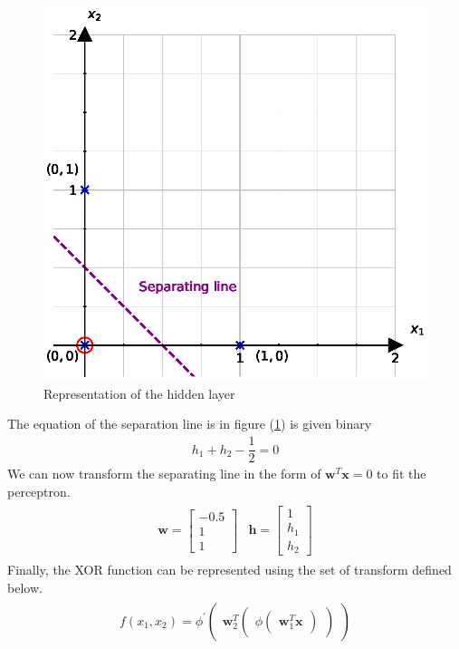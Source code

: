 \begin{figure}[H]
  \centering
  \includegraphics[scale=0.75]{CHAPTER_2/c2_fig_XOR_sep_python.eps}
  \caption{Representation of the hidden layer}
  \label{fig:XOR layer}
\end{figure}
\noindent The equation of the separation line is in figure (\ref{fig:XOR layer}) is given binary
\begin{align}
h_1 + h_2 - \dfrac{1}{2} = 0  
\end{align}
We can now transform the separating line in the form of $\textbf{w}^T\textbf{x} = 0$ to fit the perceptron.
\begin{align}
  \begin{matrix}
    \textbf{w} = \begin{bmatrix}
      -0.5 \\
      1 \\
      1
    \end{bmatrix} & \textbf{h} = \begin{bmatrix}
      1 \\
      h_1 \\
      h_2
    \end{bmatrix}  
  \end{matrix}
\end{align}
Finally, the XOR function can be represented using the set of transform defined below.
\begin{align}
  \begin{matrix}
    f(x_1,x_2) = \phi^{'} \begin{pmatrix}
    \textbf{w}_2^T 
    \begin{pmatrix}
      \phi \begin{pmatrix}
        \textbf{w}_1^T\textbf{x}
    \end{pmatrix}  
  \end{pmatrix}
  \end{pmatrix}
\end{matrix}
\end{align}
